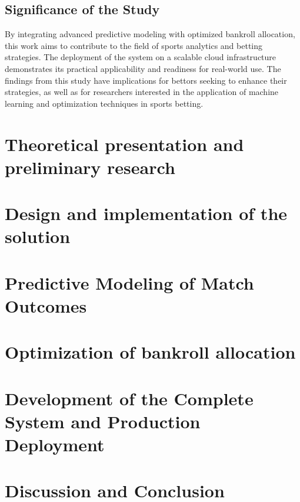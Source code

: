 \section{Significance of the Study}

By integrating advanced predictive modeling with optimized bankroll allocation, this work aims to contribute to the field of sports analytics and betting strategies. The deployment of the system on a scalable cloud infrastructure demonstrates its practical applicability and readiness for real-world use. The findings from this study have implications for bettors seeking to enhance their strategies, as well as for researchers interested in the application of machine learning and optimization techniques in sports betting.

\chapter{Theoretical presentation and preliminary research}


\chapter{Design and implementation of the solution}


\chapter{Predictive Modeling of Match Outcomes}


\chapter{Optimization of bankroll allocation}


\chapter{Development of the Complete System and Production Deployment}


\chapter{Discussion and Conclusion}


